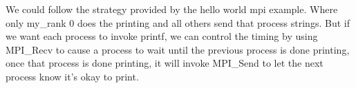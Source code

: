 \documentclass[12pt]{jhwhw}
\begin{document}
	We could follow the strategy provided by the hello world mpi example. Where
	only my_rank 0 does the printing and all others send that process strings. But
	if we want each process to invoke printf, we can control the timing by
	using MPI_Recv to cause a process to wait until the previous process is done
	printing, once that process is done printing, it will invoke MPI_Send to let
	the next process know it's okay to print.

	\begin{addmargin}[1em]{}
		\inputminted{c}{3.4.c}
	\end{addmargin}
\end{document}
